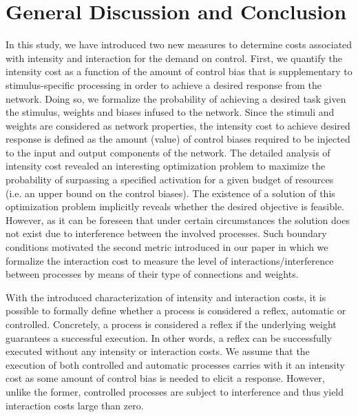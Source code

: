 \documentclass[10pt,letterpaper]{article}
\begin{document}
\section{General Discussion and Conclusion}
\label{sec:Conclusion}
%
In this study, we have introduced two new measures to determine costs associated with intensity and interaction for the demand on control. First, we quantify the intensity cost as a function of the amount of control bias that is supplementary to stimulus-specific processing in order to achieve a desired response from the network. Doing so, we formalize the probability of achieving a desired task given the stimulus, weights and biases infused to the network. Since the stimuli and weights are considered as network properties, the intensity cost to achieve desired response is defined as the amount (value) of control biases required to be injected to the input and output components of the network. The detailed analysis of intensity cost revealed an interesting optimization problem to maximize the probability of surpassing a specified activation for a given budget of resources (i.e. an upper bound on the control biases). The existence of a solution of this optimization problem implicitly reveals whether the desired objective is feasible. However, as it can be foreseen that under certain circumstances the solution does not exist due to interference between the involved processes. Such boundary conditions motivated the second metric introduced in our paper in which we formalize the interaction cost to measure the level of interactions/interference between processes by means of their type of connections and weights.

With the introduced characterization of intensity and interaction costs, it is possible to formally define whether a process is considered a reflex, automatic or controlled. Concretely, a process is considered a reflex if the underlying  weight guarantees a successful execution. In other words, a reflex can be successfully executed without any intensity or interaction costs. We assume that the execution of both controlled and automatic processes carries with it an intensity cost as some amount of control bias is needed to elicit a response. However, unlike the former, controlled processes are subject to interference and thus yield interaction costs large than zero.
  
\end{document}
